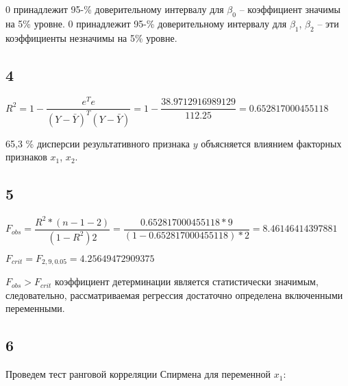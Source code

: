 \documentclass[12pt,a4paper, oneside]{extreport}
\begin{document}
0 принадлежит 95-\% доверительному интервалу для $\beta_0$ --  коэффициент значимы на 5\% уровне.
0 принадлежит 95-\% доверительному интервалу для $\beta_1$, $\beta_2$ -- эти коэффициенты незначимы на 5\% уровне.


\subsection*{4}

$R^2 = 1 - \dfrac{e^Te}{(Y-\bar{Y})^T(Y-\bar{Y})} =   1 - \dfrac{38.9712916989129}{112.25}  = 0.652817000455118$

65,3 \% дисперсии результативного признака $y$ объясняется влиянием факторных признаков $x_1$, $x_2$.


\subsection*{5}

$F_{obs} = \dfrac{R^2 * (n-1-2) }{(1-R^2) 2}  = \dfrac{0.652817000455118 * 9}{(1-0.652817000455118)*2}  = 8.46146414397881$

$F_{crit} = F_{2, 9, 0.05}  = 4.25649472909375$

$F_{obs} > F_{crit}$ коэффициент детерминации является статистически значимым, следовательно, рассматриваемая регрессия достаточно определена включенными переменными.  


\subsection*{6}

Проведем тест ранговой корреляции Спирмена для переменной $x_1$:
\end{document}
